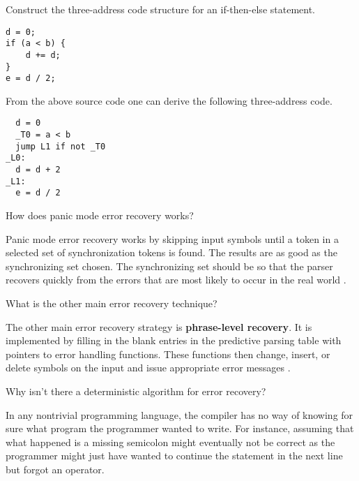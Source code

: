 \begin{Exercise}
Construct the three-address code structure for an if-then-else statement.
\end{Exercise}
\begin{Answer}
\begin{lstlisting}
d = 0;
if (a < b) {
    d += d;
}
e = d / 2;
\end{lstlisting}
From the above source code one can derive the following three-address code.
\begin{lstlisting}
  d = 0
  _T0 = a < b
  jump L1 if not _T0
_L0:
  d = d + 2
_L1:
  e = d / 2
\end{lstlisting}
\end{Answer}

\begin{Exercise}[difficulty=1]
How does panic mode error recovery works?
\end{Exercise}
\begin{Answer}
Panic mode error recovery works by skipping input symbols until a token in a selected set of synchronization tokens is found.
The results are as good as the synchronizing set chosen.
The synchronizing set should be so that the parser recovers quickly from the errors that are most likely to occur in the real world \cite[p.~229]{compilers-aho-2007}.
\end{Answer}

\begin{Exercise}
What is the other main error recovery technique?
\end{Exercise}
\begin{Answer}
The other main error recovery strategy is \textbf{phrase-level recovery}.
It is implemented by filling in the blank entries in the predictive parsing table with pointers to error handling functions.
These functions then change, insert, or delete symbols on the input and issue appropriate error messages \cite[p.~231]{compilers-aho-2007}.
\end{Answer}

\begin{Exercise}
Why isn't there a deterministic algorithm for error recovery?
\end{Exercise}
\begin{Answer}
In any nontrivial programming language, the compiler has no way of knowing for sure what program the programmer wanted to write.
For instance, assuming that what happened is a missing semicolon might eventually not be correct as the programmer might just have wanted to continue the statement in the next line but forgot an operator.
\end{Answer}

